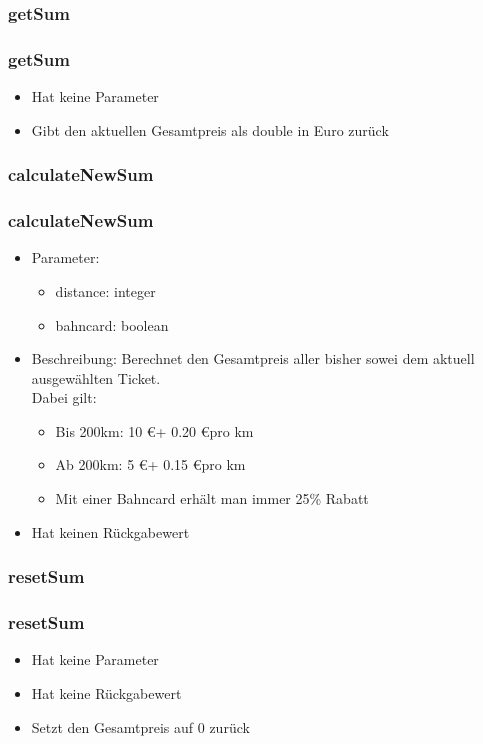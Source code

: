 \documentclass[final]{beamer}
\begin{document}
\subsubsection{getSum}
\begin{frame}
	\frametitle{getSum}
	\begin{itemize}
		\item{Hat keine Parameter}
		\item{Gibt den aktuellen Gesamtpreis als double in Euro zurück}
	\end{itemize}
\end{frame}

\subsubsection{calculateNewSum}
\begin{frame}
	\frametitle{calculateNewSum}
	\begin{itemize}
		\item{Parameter:}
			\begin{itemize}
				\item{distance: integer}
				\item{bahncard: boolean}
			\end{itemize}
		\item{Beschreibung:}
Berechnet den Gesamtpreis aller bisher sowei dem aktuell ausgewählten Ticket. \\
Dabei gilt:\\
			\begin{itemize}
				\item{Bis 200km: 10 \euro + 0.20 \euro pro km}
				\item{Ab 200km: 5 \euro + 0.15 \euro pro km}
				\item{Mit einer Bahncard erhält man immer 25\% Rabatt}
			\end{itemize}
		\item{Hat keinen Rückgabewert}
	\end{itemize}
\end{frame}

\subsubsection{resetSum}
\begin{frame}
	\frametitle{resetSum}
	\begin{itemize}
		\item{Hat keine Parameter}
		\item{Hat keine Rückgabewert}
		\item{Setzt den Gesamtpreis auf 0 zurück}
	\end{itemize}
\end{frame}
\end{document}
